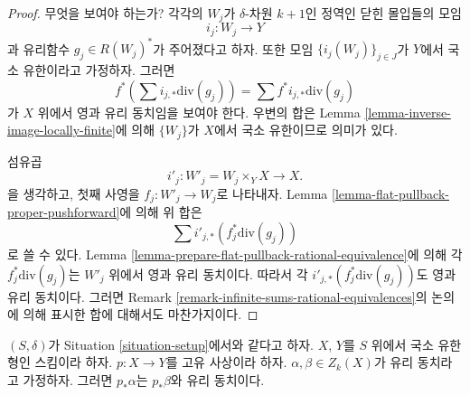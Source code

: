 \begin{proof}
무엇을 보여야 하는가? 각각의 $W_j$가 $\delta$-차원 $k + 1$인 정역인
닫힌 몰입들의 모임
$$
i_j : W_j \longrightarrow Y
$$
과 유리함수 $g_j \in R(W_j)^*$가 주어졌다고 하자. 또한 모임
$\{i_j(W_j)\}_{j \in J}$가 $Y$에서 국소 유한이라고 가정하자. 그러면
$$
f^*(\sum i_{j, *}\text{div}(g_j)) = \sum f^*i_{j, *}\text{div}(g_j)
$$
가 $X$ 위에서 영과 유리 동치임을 보여야 한다. 우변의 합은 Lemma
\ref{lemma-inverse-image-locally-finite}에 의해 $\{W_j\}$가 $X$에서
국소 유한이므로 의미가 있다.

\medskip\noindent
섬유곱
$$
i'_j : W'_j = W_j \times_Y X \longrightarrow X.
$$
을 생각하고, 첫째 사영을 $f_j : W'_j \to W_j$로 나타내자. Lemma
\ref{lemma-flat-pullback-proper-pushforward}에 의해 위 합은
$$
\sum i'_{j, *}(f_j^*\text{div}(g_j))
$$
로 쓸 수 있다. Lemma
\ref{lemma-prepare-flat-pullback-rational-equivalence}에 의해 각
$f_j^*\text{div}(g_j)$는 $W'_j$ 위에서 영과 유리 동치이다. 따라서 각
$i'_{j, *}(f_j^*\text{div}(g_j))$도 영과 유리 동치이다. 그러면 Remark
\ref{remark-infinite-sums-rational-equivalences}의 논의에 의해 표시한
합에 대해서도 마찬가지이다.
\end{proof}

\begin{lemma}
\label{lemma-proper-pushforward-rational-equivalence}
$(S, \delta)$가 Situation \ref{situation-setup}에서와 같다고 하자.
$X$, $Y$를 $S$ 위에서 국소 유한형인 스킴이라 하자.
$p : X \to Y$를 고유 사상이라 하자. $\alpha, \beta \in Z_k(X)$가
유리 동치라고 가정하자. 그러면 $p_*\alpha$는 $p_*\beta$와 유리
동치이다.
\end{lemma}

